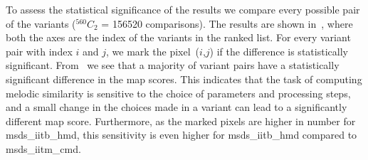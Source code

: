 To assess the statistical significance of the results we compare every possible pair of the variants ($^{560}C_{2}$ = 156520 comparisons). The results are shown in~, where both the axes are the index of the variants in the ranked list. For every variant pair with index $i$ and $j$, we mark the pixel~($i$,$j$) if the difference is statistically significant. From~ we see that a majority of variant pairs have a statistically significant difference in the \gls{map} scores. This indicates that the task of computing melodic similarity is sensitive to the choice of parameters and processing steps, and a small change in the choices made in a variant can lead to a significantly different \gls{map} score. Furthermore, as the marked pixels are higher in number for \acrshort{msds_iitb_hmd}, this sensitivity is even higher for \acrshort{msds_iitb_hmd} compared to \acrshort{msds_iitm_cmd}.


